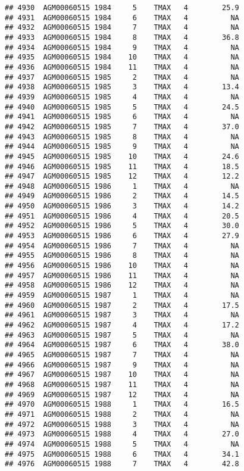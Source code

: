 \documentclass{article}\usepackage[]{graphicx}\usepackage[]{color}
\makeatletter
\newenvironment{kframe}{%
 \def\at@end@of@kframe{}%
 \ifinner\ifhmode%
  \def\at@end@of@kframe{\end{minipage}}%
  \begin{minipage}{\columnwidth}%
 \fi\fi%
 \def\FrameCommand##1{\hskip\@totalleftmargin \hskip-\fboxsep
 \colorbox{shadecolor}{##1}\hskip-\fboxsep
     \hskip-\linewidth \hskip-\@totalleftmargin \hskip\columnwidth}%
 \MakeFramed {\advance\hsize-\width
   \@totalleftmargin\z@ \linewidth\hsize
   \@setminipage}}%
 {\par\unskip\endMakeFramed%
 \at@end@of@kframe}
\newenvironment{knitrout}{}{} %
\makeatother
\begin{document}
\begin{knitrout}
\begin{kframe}
\begin{verbatim}
## 4930  AGM00060515 1984     5    TMAX   4        25.9
## 4931  AGM00060515 1984     6    TMAX   4          NA
## 4932  AGM00060515 1984     7    TMAX   4          NA
## 4933  AGM00060515 1984     8    TMAX   4        36.8
## 4934  AGM00060515 1984     9    TMAX   4          NA
## 4935  AGM00060515 1984    10    TMAX   4          NA
## 4936  AGM00060515 1984    11    TMAX   4          NA
## 4937  AGM00060515 1985     2    TMAX   4          NA
## 4938  AGM00060515 1985     3    TMAX   4        13.4
## 4939  AGM00060515 1985     4    TMAX   4          NA
## 4940  AGM00060515 1985     5    TMAX   4        24.5
## 4941  AGM00060515 1985     6    TMAX   4          NA
## 4942  AGM00060515 1985     7    TMAX   4        37.0
## 4943  AGM00060515 1985     8    TMAX   4          NA
## 4944  AGM00060515 1985     9    TMAX   4          NA
## 4945  AGM00060515 1985    10    TMAX   4        24.6
## 4946  AGM00060515 1985    11    TMAX   4        18.5
## 4947  AGM00060515 1985    12    TMAX   4        12.2
## 4948  AGM00060515 1986     1    TMAX   4          NA
## 4949  AGM00060515 1986     2    TMAX   4        14.5
## 4950  AGM00060515 1986     3    TMAX   4        14.2
## 4951  AGM00060515 1986     4    TMAX   4        20.5
## 4952  AGM00060515 1986     5    TMAX   4        30.0
## 4953  AGM00060515 1986     6    TMAX   4        27.9
## 4954  AGM00060515 1986     7    TMAX   4          NA
## 4955  AGM00060515 1986     8    TMAX   4          NA
## 4956  AGM00060515 1986    10    TMAX   4          NA
## 4957  AGM00060515 1986    11    TMAX   4          NA
## 4958  AGM00060515 1986    12    TMAX   4          NA
## 4959  AGM00060515 1987     1    TMAX   4          NA
## 4960  AGM00060515 1987     2    TMAX   4        17.5
## 4961  AGM00060515 1987     3    TMAX   4          NA
## 4962  AGM00060515 1987     4    TMAX   4        17.2
## 4963  AGM00060515 1987     5    TMAX   4          NA
## 4964  AGM00060515 1987     6    TMAX   4        38.0
## 4965  AGM00060515 1987     7    TMAX   4          NA
## 4966  AGM00060515 1987     9    TMAX   4          NA
## 4967  AGM00060515 1987    10    TMAX   4          NA
## 4968  AGM00060515 1987    11    TMAX   4          NA
## 4969  AGM00060515 1987    12    TMAX   4          NA
## 4970  AGM00060515 1988     1    TMAX   4        16.5
## 4971  AGM00060515 1988     2    TMAX   4          NA
## 4972  AGM00060515 1988     3    TMAX   4          NA
## 4973  AGM00060515 1988     4    TMAX   4        27.0
## 4974  AGM00060515 1988     5    TMAX   4          NA
## 4975  AGM00060515 1988     6    TMAX   4        34.1
## 4976  AGM00060515 1988     7    TMAX   4        42.8

\end{verbatim}
\end{kframe}
\end{knitrout}
\end{document}
